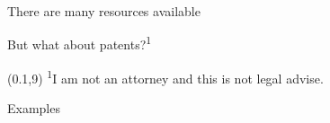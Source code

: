 \begin{frame}{There are many resources available}
 \begin{fullpageitemize}
  \item \begin{center}\end{center}
  \item \begin{center}\end{center}
  \item \begin{center}\end{center}
 \end{fullpageitemize}
\end{frame}


\begin{frame}{But what about patents?\textsuperscript{1}}
 \begin{fullpageitemize}
  \item \begin{center}\end{center}
  \item \begin{center}\end{center}
  \item \begin{center}\end{center}
 \end{fullpageitemize}
 \begin{textblock}{11.5}(0.1,9)
  \footnotesize{\notosansfont \textsuperscript{1}I am not an attorney and this is not legal advise.}
 \end{textblock}
\end{frame}


\begin{frame}{Examples}
 \begin{fullpageitemize}
  \item \begin{center}\end{center}
  \item \begin{center}\end{center}
 \end{fullpageitemize}
\end{frame}

